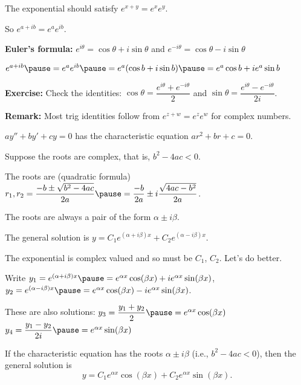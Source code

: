 \documentclass[10pt,aspectratio=169]{beamer}
\begin{document}
\begin{frame}
The exponential should satisfy $e^{x+y} = e^xe^y$.

\medskip
\pause

So $e^{a+ib} = e^a e^{ib}$.

\medskip
\pause

\textbf{Euler's formula:}
\quad
$e^{i \theta} = \cos \theta + i \sin \theta$
\quad and \quad
$e^{- i \theta} = \cos \theta - i \sin \theta$

\medskip
\pause

\thus\quad
$e^{a+ib} 
\pause
= e^a e^{ib}
\pause
=
e^a (\cos b + i \sin b)
\pause
=
e^a \cos b + i e^a \sin b$

\medskip
\pause

\textbf{Exercise:}
Check the identities:
\quad
$\cos \theta = \dfrac{e^{i \theta} + e^{-i \theta}}{2}$
\quad and \quad
$\sin \theta = \dfrac{e^{i \theta} - e^{-i \theta}}{2i}$.

\medskip
\pause

\textbf{Remark:} Most trig identities follow from $e^{z+w} = e^ze^w$ for
complex numbers.

\end{frame}

\begin{frame}
$ay'' + by' + cy = 0$ has the characteristic equation $a r^2 + b r + c = 0$.

\medskip
\pause

Suppose the roots are complex, that is, $b^2 - 4ac < 0$.

\medskip
\pause

The roots are (quadratic formula)
\quad
$r_1,r_2
=
\dfrac{-b \pm \sqrt{b^2 - 4ac}}{2a}
\pause
=
\dfrac{-b}{2a} \pm i\dfrac{\sqrt{4ac - b^2}}{2a}$.

\medskip
\pause

The roots are always a pair of the form $\alpha \pm i \beta$.

\medskip
\pause

The general solution is
\quad
$y = C_1 e^{(\alpha+i\beta)x} + C_2 e^{(\alpha-i\beta)x}$.

\medskip
\pause

The exponential is complex valued and so must be $C_1$, $C_2$.
Let's do better.

\medskip
\pause

Write
\quad
$y_1
= e^{(\alpha+i\beta)x}
\pause
=
e^{\alpha x} \cos (\beta x) + i e^{\alpha x} \sin (\beta x)$,
\quad
$y_2
= e^{(\alpha-i\beta)x}
\pause
=
e^{\alpha x} \cos (\beta x) - i e^{\alpha x} \sin (\beta x)$.

\medskip
\pause

These are also solutions:
\quad
$y_3 = \dfrac{y_1 + y_2}{2}
\pause 
= e^{\alpha x} \cos (\beta x)$
\quad
$y_4  = \dfrac{y_1 - y_2}{2i}
\pause
= e^{\alpha x} \sin (\beta x)$

\pause
\begin{theorem}
If the characteristic equation has the roots $\alpha \pm i \beta$
(i.e., $b^2 - 4ac < 0$),
then the general solution is
\[
y = C_1 e^{\alpha x} \cos (\beta x) + C_2 e^{\alpha x} \sin (\beta x) .
\]
\end{theorem}
\end{frame}
\end{document}
